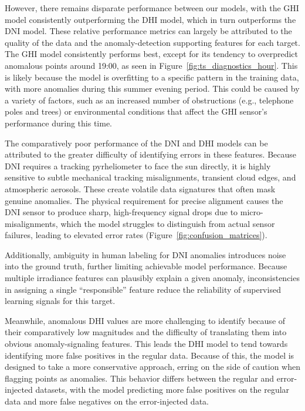 \documentclass[12pt]{article}
\begin{document}
However, there remains disparate performance between our models, with the GHI model consistently outperforming the DHI model, which in turn outperforms the DNI model. These relative performance metrics can largely be attributed to the quality of the data and the anomaly-detection supporting features for each target. The GHI model consistently performs best, except for its tendency to overpredict anomalous points around 19:00, as seen in Figure~\ref{fig:ts_diagnostics_hour}. This is likely because the model is overfitting to a specific pattern in the training data, with more anomalies during this summer evening period. This could be caused by a variety of factors, such as an increased number of obstructions (e.g., telephone poles and trees) or environmental conditions that affect the GHI sensor's performance during this time.

The comparatively poor performance of the DNI and DHI models can be attributed to the greater difficulty of identifying errors in these features. Because DNI requires a tracking pyrheliometer to face the sun directly, it is highly sensitive to subtle mechanical tracking misalignments, transient cloud edges, and atmospheric aerosols. These create volatile data signatures that often mask genuine anomalies. The physical requirement for precise alignment causes the DNI sensor to produce sharp, high-frequency signal drops due to micro-misalignments, which the model struggles to distinguish from actual sensor failures, leading to elevated error rates (Figure~\ref{fig:confusion_matrices}).

Additionally, ambiguity in human labeling for DNI anomalies introduces noise into the ground truth, further limiting achievable model performance. Because multiple irradiance features can plausibly explain a given anomaly, inconsistencies in assigning a single ``responsible'' feature reduce the reliability of supervised learning signals for this target.

Meanwhile, anomalous DHI values are more challenging to identify because of their comparatively low magnitudes and the difficulty of translating them into obvious anomaly-signaling features. This leads the DHI model to tend towards identifying more false positives in the regular data. Because of this, the model is designed to take a more conservative approach, erring on the side of caution when flagging points as anomalies. This behavior differs between the regular and error-injected datasets, with the model predicting more false positives on the regular data and more false negatives on the error-injected data. 
\end{document}

